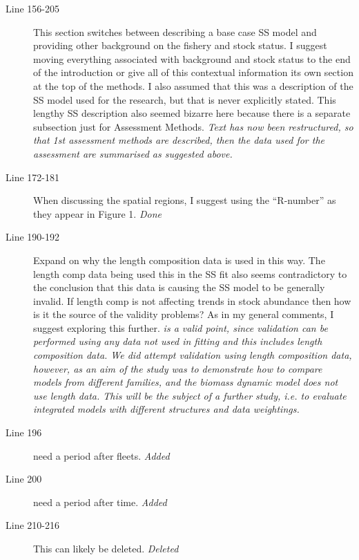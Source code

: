 \begin{itemize}
\begin{description}
\item[Line 156-205] This section switches between describing a base case SS model and providing other background on the fishery and stock status. I suggest moving everything associated with background and stock status to the end of the introduction or give all of this contextual information its own section at the top of the methods. I also assumed that this was a description of the SS model used for the research, but that is never explicitly stated. This lengthy SS description also seemed bizarre here because there is a separate subsection just for Assessment Methods.
\textit{\newline Text has now been restructured, so that 1st assessment methods are described, then the data used for the assessment are summarised as suggested above.}

\item[Line 172-181] When discussing the spatial regions, I suggest using the “R-number” as they appear in Figure 1.
\textit{\newline Done}

\item[Line 190-192] Expand on why the length composition data is used in this way. The length comp data being used this in the SS fit also seems contradictory to the conclusion that this data is causing the SS model to be generally invalid. If length comp is not affecting trends in stock abundance then how is it the source of the validity problems? As in my general comments, I suggest exploring this further.
\textit{\newlineThis is a valid point, since validation can be performed using any data not used in fitting and this includes length composition data. We did attempt validation using length composition data, however, as an aim of the study was to demonstrate how to compare models from different families, and the biomass dynamic model does not use length data. This will be the subject of a further study, i.e. to evaluate integrated models with different structures and data weightings.}

\item[Line 196] need a period after fleets.
\textit{\newline Added}

\item[Line 200] need a period after time.
\textit{\newline Added}

\item[Line 210-216] This can likely be deleted.
\textit{\newline Deleted}


\end{description}
\end{itemize}
